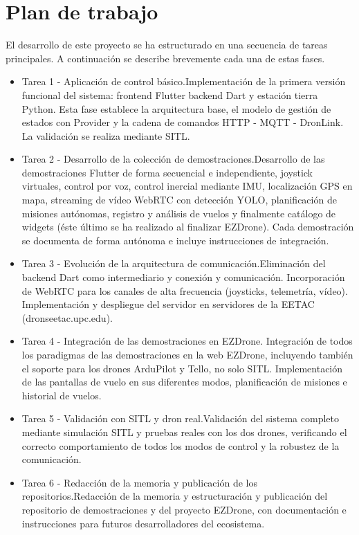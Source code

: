 \section{Plan de trabajo}
El desarrollo de este proyecto se ha estructurado en una secuencia de tareas principales. A continuación se describe brevemente cada una de estas fases.
\begin{itemize}
    \item {Tarea 1 - Aplicación de control básico.}Implementación de la primera versión funcional del sistema: frontend Flutter backend Dart y estación tierra Python. Esta fase establece la arquitectura base, el modelo de gestión de estados con Provider y la cadena de comandos HTTP - MQTT - DronLink. La validación se realiza mediante SITL.
    \item {Tarea 2 - Desarrollo de la colección de demostraciones.}Desarrollo de las demostraciones Flutter de forma secuencial e independiente, joystick virtuales, control por voz, control inercial mediante IMU, localización GPS en mapa, streaming de vídeo WebRTC con detección YOLO, planificación de misiones autónomas, registro y análisis de vuelos y finalmente catálogo de widgets (éste último se ha realizado al finalizar EZDrone). Cada demostración se documenta de forma autónoma e incluye instrucciones de integración.
    \item {Tarea 3 - Evolución de la arquitectura de comunicación.}Eliminación del backend Dart como intermediario y conexión y comunicación. Incorporación de WebRTC para los canales de alta frecuencia (joysticks, telemetría, vídeo). Implementación y despliegue del servidor en servidores de la EETAC (dronseetac.upc.edu).
    \item {Tarea 4 - Integración de las demostraciones en EZDrone.}
    Integración de todos los paradigmas de las demostraciones en la web EZDrone, incluyendo también el soporte para los drones ArduPilot y Tello, no solo SITL. Implementación de las pantallas de vuelo en sus diferentes modos, planificación de misiones e historial de vuelos.
    \item {Tarea 5 - Validación con SITL y dron real.}Validación del sistema completo mediante simulación SITL y pruebas reales con los dos drones, verificando el correcto comportamiento de todos los modos de control y la robustez de la comunicación.
    \item {Tarea 6 - Redacción de la memoria y publicación de los repositorios.}Redacción de la memoria y estructuración y publicación del repositorio de demostraciones y del proyecto EZDrone, con documentación e instrucciones para futuros desarrolladores del ecosistema.
\end{itemize}